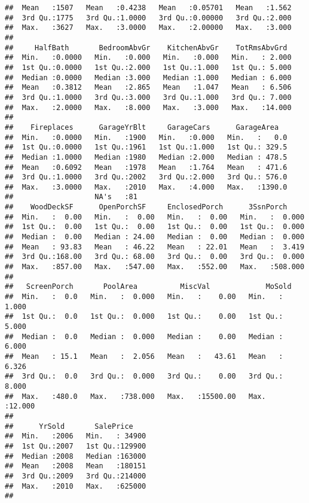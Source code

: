 \documentclass[]{article}
\begin{document}
\begin{verbatim}
##  Mean   :1507   Mean   :0.4238   Mean   :0.05701   Mean   :1.562  
##  3rd Qu.:1775   3rd Qu.:1.0000   3rd Qu.:0.00000   3rd Qu.:2.000  
##  Max.   :3627   Max.   :3.0000   Max.   :2.00000   Max.   :3.000  
##                                                                   
##     HalfBath       BedroomAbvGr    KitchenAbvGr    TotRmsAbvGrd   
##  Min.   :0.0000   Min.   :0.000   Min.   :0.000   Min.   : 2.000  
##  1st Qu.:0.0000   1st Qu.:2.000   1st Qu.:1.000   1st Qu.: 5.000  
##  Median :0.0000   Median :3.000   Median :1.000   Median : 6.000  
##  Mean   :0.3812   Mean   :2.865   Mean   :1.047   Mean   : 6.506  
##  3rd Qu.:1.0000   3rd Qu.:3.000   3rd Qu.:1.000   3rd Qu.: 7.000  
##  Max.   :2.0000   Max.   :8.000   Max.   :3.000   Max.   :14.000  
##                                                                   
##    Fireplaces      GarageYrBlt     GarageCars      GarageArea    
##  Min.   :0.0000   Min.   :1900   Min.   :0.000   Min.   :   0.0  
##  1st Qu.:0.0000   1st Qu.:1961   1st Qu.:1.000   1st Qu.: 329.5  
##  Median :1.0000   Median :1980   Median :2.000   Median : 478.5  
##  Mean   :0.6092   Mean   :1978   Mean   :1.764   Mean   : 471.6  
##  3rd Qu.:1.0000   3rd Qu.:2002   3rd Qu.:2.000   3rd Qu.: 576.0  
##  Max.   :3.0000   Max.   :2010   Max.   :4.000   Max.   :1390.0  
##                   NA's   :81                                     
##    WoodDeckSF      OpenPorchSF     EnclosedPorch      3SsnPorch      
##  Min.   :  0.00   Min.   :  0.00   Min.   :  0.00   Min.   :  0.000  
##  1st Qu.:  0.00   1st Qu.:  0.00   1st Qu.:  0.00   1st Qu.:  0.000  
##  Median :  0.00   Median : 24.00   Median :  0.00   Median :  0.000  
##  Mean   : 93.83   Mean   : 46.22   Mean   : 22.01   Mean   :  3.419  
##  3rd Qu.:168.00   3rd Qu.: 68.00   3rd Qu.:  0.00   3rd Qu.:  0.000  
##  Max.   :857.00   Max.   :547.00   Max.   :552.00   Max.   :508.000  
##                                                                      
##   ScreenPorch       PoolArea          MiscVal             MoSold      
##  Min.   :  0.0   Min.   :  0.000   Min.   :    0.00   Min.   : 1.000  
##  1st Qu.:  0.0   1st Qu.:  0.000   1st Qu.:    0.00   1st Qu.: 5.000  
##  Median :  0.0   Median :  0.000   Median :    0.00   Median : 6.000  
##  Mean   : 15.1   Mean   :  2.056   Mean   :   43.61   Mean   : 6.326  
##  3rd Qu.:  0.0   3rd Qu.:  0.000   3rd Qu.:    0.00   3rd Qu.: 8.000  
##  Max.   :480.0   Max.   :738.000   Max.   :15500.00   Max.   :12.000  
##                                                                       
##      YrSold       SalePrice     
##  Min.   :2006   Min.   : 34900  
##  1st Qu.:2007   1st Qu.:129900  
##  Median :2008   Median :163000  
##  Mean   :2008   Mean   :180151  
##  3rd Qu.:2009   3rd Qu.:214000  
##  Max.   :2010   Max.   :625000  
## 
\end{verbatim}
\end{document}
